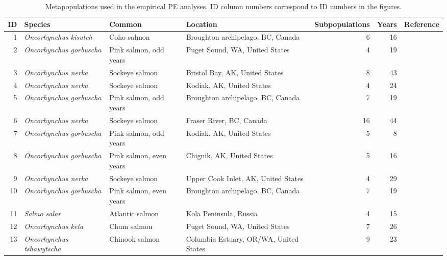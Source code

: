 \begin{table}[ht]
\begin{center}
\caption[Metapopulations used in the empirical PE analyses.]{Metapopulations used in the empirical PE analyses. ID column numbers correspond to ID numbers in the figures.}
\label{tab:datasources}
{\tiny
\begin{tabular}{rlllrrl}
  \toprule
ID & Species & Common & Location & Subpopulations & Years & Reference \\
  \midrule
  1 & \textit{Oncorhynchus kisutch} & Coho salmon & Broughton archipelago, BC, Canada &   6 &  16 & \citep{krkosek2011} \\
    2 & \textit{Oncorhynchus gorbuscha} & Pink salmon, odd years & Puget Sound, WA, United States &   4 &  19 & \citep{dorner2008} \\
    3 & \textit{Oncorhynchus nerka} & Sockeye salmon & Bristol Bay, AK, United States &   8 &  43 & \citep{west2006} \\
    4 & \textit{Oncorhynchus nerka} & Sockeye salmon & Kodiak, AK, United States &   4 &  24 & \citep{dorner2008} \\
    5 & \textit{Oncorhynchus gorbuscha} & Pink salmon, odd years & Broughton archipelago, BC, Canada &   7 &  19 & \citep{krkosek2011} \\
    6 & \textit{Oncorhynchus nerka} & Sockeye salmon & Fraser River, BC, Canada &  16 &  44 & \citep{dorner2008} \\
    7 & \textit{Oncorhynchus gorbuscha} & Pink salmon, odd years & Kodiak, AK, United States &   5 &   8 & \citep{dorner2008} \\
    8 & \textit{Oncorhynchus gorbuscha} & Pink salmon, even years & Chignik, AK, United States &   5 &  16 & \citep{dorner2008} \\
    9 & \textit{Oncorhynchus nerka} & Sockeye salmon & Upper Cook Inlet, AK, United States &   4 &  29 & \citep{fair2011} \\
   10 & \textit{Oncorhynchus gorbuscha} & Pink salmon, even years & Broughton archipelago, BC, Canada &   7 &  19 & \citep{krkosek2011} \\
   11 & \textit{Salmo salar} & Atlantic salmon & Kola Peninsula, Russia &   4 &  15 & \citep{jensen1999} \\
   12 & \textit{Oncorhynchus keta} & Chum salmon & Puget Sound, WA, United States &   7 &  26 & \citep{dorner2008} \\
   13 & \textit{Oncorhynchus tshawytscha} & Chinook salmon & Columbia Estuary, OR/WA, United States &   9 &  23 & \citep{streamnet2011} \\

\end{tabular}}
\end{center}
\end{table}
